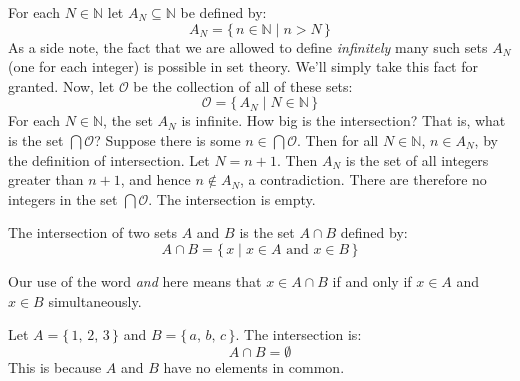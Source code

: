             \begin{example}
                For each $N\in\mathbb{N}$ let $A_{N}\subseteq\mathbb{N}$ be
                defined by:
                \begin{equation}
                    A_{N}=\{\,n\in\mathbb{N}\;|\;n>N\,\}
                \end{equation}
                As a side note, the fact that we are allowed to define
                \textit{infinitely} many such sets $A_{N}$ (one for each
                integer) is possible in set theory. We'll simply take this
                fact for granted. Now, let $\mathcal{O}$ be the collection
                of all of these sets:
                \begin{equation}
                    \mathcal{O}=\{\,A_{N}\;|\;N\in\mathbb{N}\,\}
                \end{equation}
                For each $N\in\mathbb{N}$, the set $A_{N}$ is infinite.
                How big is the intersection? That is, what is the set
                $\bigcap\mathcal{O}$? Suppose there is some
                $n\in\bigcap\mathcal{O}$. Then for all $N\in\mathbb{N}$,
                $n\in{A}_{N}$, by the definition of intersection.
                Let $N=n+1$. Then $A_{N}$ is the set of all integers
                greater than $n+1$, and hence $n\notin{A}_{N}$, a
                contradiction. There are therefore no integers in the
                set $\bigcap\mathcal{O}$. The intersection is empty.
            \end{example}
            \begin{definition}
                The intersection of two sets $A$ and $B$ is the set
                $A\cap{B}$ defined by:
                \begin{equation}
                    A\cap{B}=\{\,x\;|\;x\in{A}\textrm{ and }x\in{B}\,\}
                \end{equation}
            \end{definition}
            Our use of the word \textit{and} here means that
            $x\in{A}\cap{B}$ if and only if $x\in{A}$ and $x\in{B}$
            simultaneously.
            \begin{example}
                Let $A=\{\,1,\,2,\,3\,\}$ and $B=\{\,a,\,b,\,c\,\}$. The
                intersection is:
                \begin{equation}
                    A\cap{B}=\emptyset
                \end{equation}
                This is because $A$ and $B$ have no elements in common.
            \end{example}
